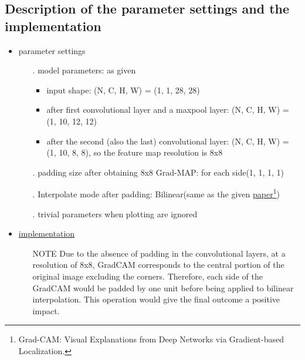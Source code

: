 \documentclass[12pt]{article}
\begin{document}
\subsection{Description of the parameter settings and the implementation}
\begin{itemize}
    \item parameter settings\begin{itemize}
        \item[.] model parameters: as given\begin{itemize}
            \item input shape: (N, C, H, W) = (1, 1, 28, 28)
            \item after first convolutional layer and a maxpool layer: (N, C, H, W) = (1, 10, 12, 12)
            \item after the second (also the last) convolutional layer: (N, C, H, W) = (1, 10, 8, 8), so the feature map resolution is 8x8
        \end{itemize}
        \item[.] padding size after obtaining 8x8 Grad-MAP: for each side(1, 1, 1, 1)
        \item[.] Interpolate mode after padding: Bilinear(same as the given \href{https://arxiv.org/pdf/1610.02391.pdf}{paper}\footnote{Grad-CAM: Visual Explanations from Deep Networks via Gradient-based Localization.})
        \item[.] trivial parameters when plotting are ignored
    \end{itemize}
    \item \hyperref[alg:alg]{implementation}\begin{itemize}
        \item[NOTE] Due to the absence of padding in the convolutional layers, at a resolution of 8x8, GradCAM corresponds to the central portion of the original image excluding the corners. Therefore, each side of the GradCAM would be padded by one unit before being applied to bilinear interpolation. This operation would give the final outcome a positive impact.
    \end{itemize}
\end{itemize}
\end{document}
